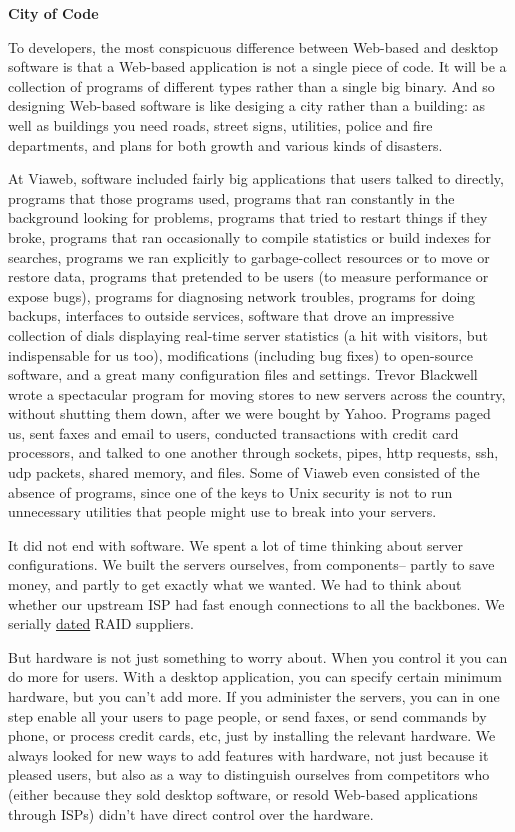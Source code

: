 \documentclass[12pt]{book}
\begin{document}
\textbf{City of Code}

To developers, the most conspicuous difference between Web-based and
desktop software is that a Web-based application is not a single piece
of code. It will be a collection of programs of different types rather
than a single big binary. And so designing Web-based software is like
desiging a city rather than a building: as well as buildings you need
roads, street signs, utilities, police and fire departments, and plans
for both growth and various kinds of disasters.

At Viaweb, software included fairly big applications that users talked
to directly, programs that those programs used, programs that ran
constantly in the background looking for problems, programs that tried
to restart things if they broke, programs that ran occasionally to
compile statistics or build indexes for searches, programs we ran
explicitly to garbage-collect resources or to move or restore data,
programs that pretended to be users (to measure performance or expose
bugs), programs for diagnosing network troubles, programs for doing
backups, interfaces to outside services, software that drove an
impressive collection of dials displaying real-time server statistics (a
hit with visitors, but indispensable for us too), modifications
(including bug fixes) to open-source software, and a great many
configuration files and settings. Trevor Blackwell wrote a spectacular
program for moving stores to new servers across the country, without
shutting them down, after we were bought by Yahoo. Programs paged us,
sent faxes and email to users, conducted transactions with credit card
processors, and talked to one another through sockets, pipes, http
requests, ssh, udp packets, shared memory, and files. Some of Viaweb
even consisted of the absence of programs, since one of the keys to Unix
security is not to run unnecessary utilities that people might use to
break into your servers.

It did not end with software. We spent a lot of time thinking about
server configurations. We built the servers ourselves, from components--
partly to save money, and partly to get exactly what we wanted. We had
to think about whether our upstream ISP had fast enough connections to
all the backbones. We serially
\href{http://groups.google.com/groups?selm=6hdipo\%243o0\%241\%40FreeBSD.csie.NCTU.edu.tw}{dated}
RAID suppliers.

But hardware is not just something to worry about. When you control it
you can do more for users. With a desktop application, you can specify
certain minimum hardware, but you can't add more. If you administer the
servers, you can in one step enable all your users to page people, or
send faxes, or send commands by phone, or process credit cards, etc,
just by installing the relevant hardware. We always looked for new ways
to add features with hardware, not just because it pleased users, but
also as a way to distinguish ourselves from competitors who (either
because they sold desktop software, or resold Web-based applications
through ISPs) didn't have direct control over the hardware.
\end{document}
